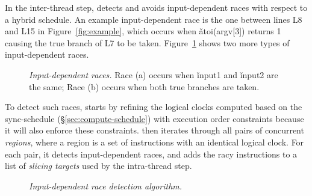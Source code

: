 In the inter-thread step, \peregrine detects and avoids input-dependent races
with respect to a hybrid schedule.  An example input-dependent race is the
one between lines L8 and L15 in Figure~\ref{fig:example}, which occurs when
\v{atoi(argv[3])} returns 1 causing the true branch of L7 to be taken.
Figure~\ref{fig:input-race-examples} shows two more types of input-dependent races.

\begin{figure}[b]
\vspace{-.1in}
\centering
{}
\begin{minipage}[b]{.225\textwidth}
\end{minipage}
\begin{minipage}[b]{.225\textwidth}
\end{minipage}
\vspace{-.1in}
\caption{{\em Input-dependent races.} Race (a) occurs when
  \v{input1} and \v{input2} are the same; Race (b) occurs when
  both true branches are taken.} \label{fig:input-race-examples}
\end{figure}

To detect such races, \peregrine starts by refining the logical clocks computed
based on the sync-schedule (\S\ref{sec:compute-schedule}) with
execution order constraints because it will also enforce these
constraints.  \peregrine then iterates through all pairs
of concurrent \emph{regions}, where a region is a set of instructions with an identical
logical clock.  For each pair, it detects input-dependent races, and adds
the racy instructions to a list of \emph{slicing targets} used by the
intra-thread step.

\begin{figure}[t]
\centering
\begin{minipage}[t]{.5\textwidth}
\end{minipage}
\vspace{-.2in}
\caption{{\em Input-dependent race detection
    algorithm.}} \label{fig:detect-input-race}
\vspace{-.1in}
\end{figure}

